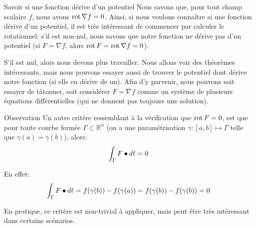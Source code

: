 \documentclass[a4paper]{article}
\begin{document}
\begin{parag}{Savoir si une fonction dérive d'un potentiel}
    Nous savons que, pour tout champ scalaire $f$, nous avons $\operatorname{rot} \nabla f = 0$. Ainsi, si nous voulons connaître si une fonction dérive d'un potentiel, il est très intéressant de commencer par calculer le rotationnel: s'il est non-nul, nous savons que notre fonction ne dérive pas d'un potentiel (si $F = \nabla f$, alors $\operatorname{rot} F = \operatorname{rot} \nabla f = 0$).

    S'il est nul, alors nous devons plus travailler. Nous allons voir des théorèmes intéressants, mais nous pouvons essayer aussi de trouver le potentiel dont dérive notre fonction (si elle en dérive de un). Afin d'y parvenir, nous pouvons soit essayer de tâtonner, soit considérer $F = \nabla f$ comme un système de plusieurs équations différentielles (qui ne donnent pas toujours une solution).

    \begin{subparag}{Observation}
        Un autre critère ressemblant à la vérification que $\operatorname{rot} F = 0$, est que pour toute courbe fermée $\Gamma \subset \mathbb{R}^n$ (on a une paramétrisation $\gamma : \left[a, b\right] \mapsto \Gamma$ telle que $\gamma\left(a\right) = \gamma\left(b\right)$), alors: 
        \[\int_{\Gamma} F \bullet d \ell = 0\]

        En effet: 
        \[\int_{\Gamma} F \dotprod d \ell = f\left(\gamma\left(b\right)\right) - f\left(\gamma\left(a\right)\right) = f\left(\gamma\left(b\right)\right) - f\left(\gamma\left(b\right)\right) = 0\]

        En pratique, ce critère est non-trivial à appliquer, mais peut être très intéressant dans certains scénarios. 
    \end{subparag}
    
\end{parag}
\end{document}
